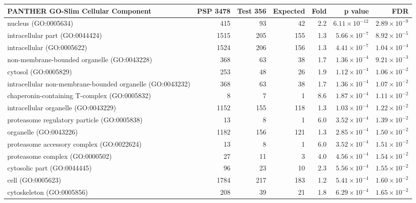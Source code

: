 \begin{table}[ht]
\centering
\begin{adjustbox}{width=\textwidth}
\begin{tabular}{lrrrrrr}
  \hline
PANTHER GO-Slim Cellular Component & PSP 3478 & Test 356 & Expected & Fold & p value & FDR \\ 
  \hline
nucleus (GO:0005634) & 415 & 93 & 42 & 2.2 & $6.11 \times 10^{-12}$ & $2.89 \times 10^{-9}$ \\ 
  intracellular part (GO:0044424) & 1515 & 205 & 155 & 1.3 & $5.66 \times 10^{-7}$ & $8.92 \times 10^{-5}$ \\ 
  intracellular (GO:0005622) & 1524 & 206 & 156 & 1.3 & $4.41 \times 10^{-7}$ & $1.04 \times 10^{-4}$ \\ 
  non-membrane-bounded organelle (GO:0043228) & 368 & 63 & 38 & 1.7 & $1.36 \times 10^{-4}$ & $9.21 \times 10^{-3}$ \\ 
  cytosol (GO:0005829) & 253 & 48 & 26 & 1.9 & $1.12 \times 10^{-4}$ & $1.06 \times 10^{-2}$ \\ 
  intracellular non-membrane-bounded organelle (GO:0043232) & 368 & 63 & 38 & 1.7 & $1.36 \times 10^{-4}$ & $1.07 \times 10^{-2}$ \\ 
  chaperonin-containing T-complex (GO:0005832) & 8 & 7 & 1 & 8.6 & $1.87 \times 10^{-4}$ & $1.11 \times 10^{-2}$ \\ 
  intracellular organelle (GO:0043229) & 1152 & 155 & 118 & 1.3 & $1.03 \times 10^{-4}$ & $1.22 \times 10^{-2}$ \\ 
  proteasome regulatory particle (GO:0005838) & 13 & 8 & 1 & 6.0 & $3.52 \times 10^{-4}$ & $1.39 \times 10^{-2}$ \\ 
  organelle (GO:0043226) & 1182 & 156 & 121 & 1.3 & $2.85 \times 10^{-4}$ & $1.50 \times 10^{-2}$ \\ 
  proteasome accessory complex (GO:0022624) & 13 & 8 & 1 & 6.0 & $3.52 \times 10^{-4}$ & $1.51 \times 10^{-2}$ \\ 
  proteasome complex (GO:0000502) & 27 & 11 & 3 & 4.0 & $4.56 \times 10^{-4}$ & $1.54 \times 10^{-2}$ \\ 
  cytosolic part (GO:0044445) & 96 & 23 & 10 & 2.3 & $5.56 \times 10^{-4}$ & $1.55 \times 10^{-2}$ \\ 
  cell (GO:0005623) & 1784 & 217 & 183 & 1.2 & $5.41 \times 10^{-4}$ & $1.60 \times 10^{-2}$ \\ 
  cytoskeleton (GO:0005856) & 208 & 39 & 21 & 1.8 & $6.29 \times 10^{-4}$ & $1.65 \times 10^{-2}$ \\ 

\end{tabular}
\end{adjustbox}
\end{table}
